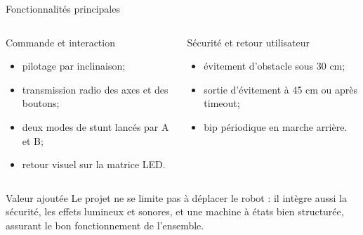 \documentclass[aspectratio=169]{beamer}
\begin{document}
\begin{frame}{Fonctionnalit\'es principales}
  \begin{columns}[T,onlytextwidth]
    \begin{block}{Commande et interaction}
      \begin{itemize}
        \item pilotage par inclinaison;
        \item transmission radio des axes et des boutons;
        \item deux modes de stunt lanc\'es par A et B;
        \item retour visuel sur la matrice LED.
      \end{itemize}
    \end{block}

    \begin{block}{S\'ecurit\'e et retour utilisateur}
      \begin{itemize}
        \item \'evitement d'obstacle sous 30 cm;
        \item sortie d'\'evitement \`a 45 cm ou apr\`es timeout;
        \item bip p\'eriodique en marche arri\`ere.
      \end{itemize}
    \end{block}
  \end{columns}

  \vspace{0.4cm}
  \begin{alertblock}{Valeur ajout\'ee}
    Le projet ne se limite pas \`a d\'eplacer le robot : il int\`egre aussi
    la s\'ecurit\'e, les effets lumineux et sonores, et une machine \`a \'etats bien structur\'ee, assurant le bon fonctionnement de l'ensemble.
  \end{alertblock}
\end{frame}
\end{document}
